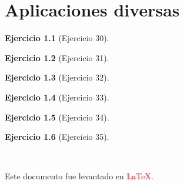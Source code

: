 \documentclass[a4paper,11pt]{book}
\newtheorem{ejer}{Ejercicio}[section]
\begin{document}
  

\chapter{Aplicaciones diversas} 

  

\begin{ejer}[Ejercicio 30] 

  

\end{ejer} 

  

\begin{ejer}[Ejercicio 31] 

  

\end{ejer} 

  

\begin{ejer}[Ejercicio 32] 

  

\end{ejer} 

  

\begin{ejer}[Ejercicio 33] 

  

\end{ejer} 

  

\begin{ejer}[Ejercicio 34] 

  

\end{ejer} 

  

\begin{ejer}[Ejercicio 35] 

  

\end{ejer} 

  

\ 

  

Este documento fue levantado en \textcolor{red}{\LaTeX}. 

  
\end{document}
